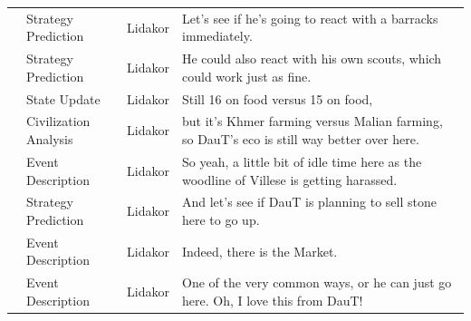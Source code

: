 {\begin{longtable}{@{}>{\theAppRow}r|L{2.3cm}L{1.0cm}U{11.55cm}@{}}
    & Strategy Prediction   & Lidakor & Let's see if he's going to react with a barracks immediately.                                                                                                                                                                                                                                   \\
    & Strategy Prediction   & Lidakor & He could also react with his own scouts, which could work just as fine.                                                                                                                                                                                                                         \\
    & State Update          & Lidakor & Still 16 on food versus 15 on food,                                                                                                                                                                                                                                                             \\
    & Civilization Analysis & Lidakor & but it's Khmer farming versus Malian farming, so DauT's eco is still way better over here.                                                                                                                                                                                                      \\
    & Event Description     & Lidakor & So yeah, a little bit of idle time here as the woodline of Villese is getting harassed.                                                                                                                                                                                                         \\
    & Strategy Prediction   & Lidakor & And let's see if DauT is planning to sell stone here to go up.                                                                                                                                                                                                                                  \\
    & Event Description     & Lidakor & Indeed, there is the Market.                                                                                                                                                                                                                                                                    \\
    & Event Description     & Lidakor & One of the very common ways, or he can just go here. Oh, I love this from DauT!                                                                                                                                                                                                                 \\

\end{longtable}}
